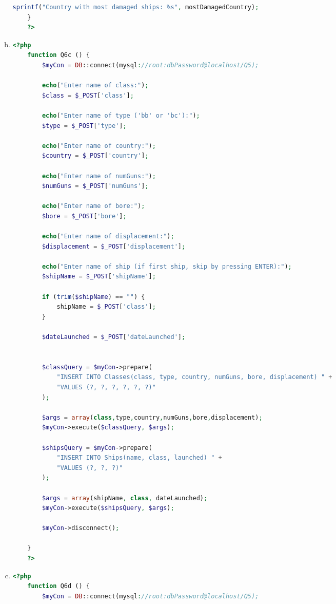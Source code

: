 \documentclass[12pt]{article}
\begin{document}
\begin{enumerate}[1.]
\begin{enumerate}[a)]
\begin{lstlisting}[language=PHP]
        sprintf("Country with most damaged ships: %s", mostDamagedCountry);
    }
    ?>
    \end{lstlisting}

        \item

    \begin{lstlisting}[language=PHP]
    <?php
    function Q6c () {
        $myCon = DB::connect(mysql://root:dbPassword@localhost/Q5);

        echo("Enter name of class:");
        $class = $_POST['class'];

        echo("Enter name of type ('bb' or 'bc'):");
        $type = $_POST['type'];

        echo("Enter name of country:");
        $country = $_POST['country'];

        echo("Enter name of numGuns:");
        $numGuns = $_POST['numGuns'];

        echo("Enter name of bore:");
        $bore = $_POST['bore'];

        echo("Enter name of displacement:");
        $displacement = $_POST['displacement'];

        echo("Enter name of ship (if first ship, skip by pressing ENTER):");
        $shipName = $_POST['shipName'];

        if (trim($shipName) == "") {
            shipName = $_POST['class'];
        }

        $dateLaunched = $_POST['dateLaunched'];


        $classQuery = $myCon->prepare(
            "INSERT INTO Classes(class, type, country, numGuns, bore, displacement) " +
            "VALUES (?, ?, ?, ?, ?, ?)"
        );

        $args = array(class,type,country,numGuns,bore,displacement);
        $myCon->execute($classQuery, $args);

        $shipsQuery = $myCon->prepare(
            "INSERT INTO Ships(name, class, launched) " +
            "VALUES (?, ?, ?)"
        );

        $args = array(shipName, class, dateLaunched);
        $myCon->execute($shipsQuery, $args);

        $myCon->disconnect();

    }
    ?>
    \end{lstlisting}

        \item

    \begin{lstlisting}[language=PHP]
    <?php
    function Q6d () {
        $myCon = DB::connect(mysql://root:dbPassword@localhost/Q5);


\end{lstlisting}
\end{enumerate}
\end{enumerate}
\end{document}

